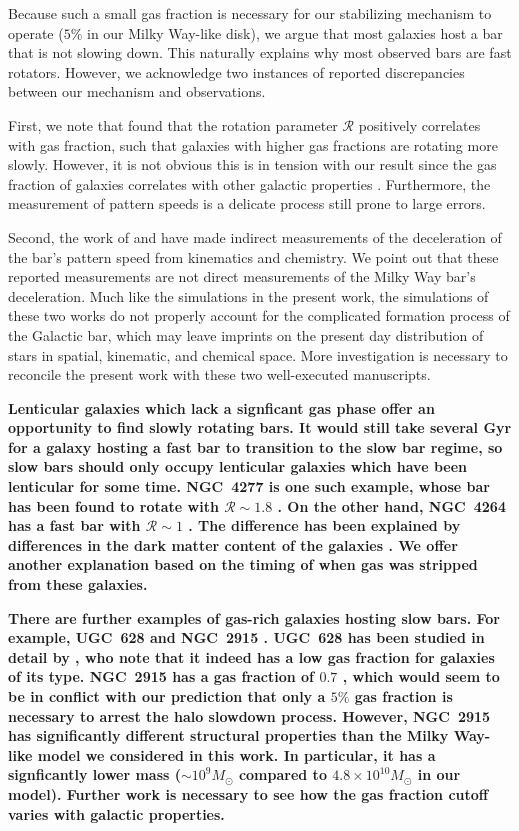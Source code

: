 \documentclass[twocolumn,linenumbers,trackchanges]{aastex631}
\newcommand{\Rot}{\ensuremath{\mathcal{R}}}
\newcommand{\Msun}{\ensuremath{M_{\odot}}}
\begin{document}
Because such a small gas fraction is necessary for our stabilizing mechanism to
operate ($5\%$ in our Milky Way-like disk), we argue that most galaxies host a
bar that is not slowing down. This naturally explains why most observed bars are
fast rotators. However, we acknowledge two instances of reported discrepancies
between our mechanism and observations.

First, we note that \citet{2020MNRAS.491.3655G} found that the rotation
parameter \Rot{} positively correlates with gas fraction, such that galaxies
with higher gas fractions are rotating more slowly. However, it is not obvious
this is in tension with our result since the gas fraction of galaxies correlates
with other galactic properties \citep{2009ARAA..47..159B}. Furthermore, the
measurement of pattern speeds is a delicate process still prone to large errors.

Second, the work of \citet{2021MNRAS.500.4710C} and \citet{2021MNRAS.505.2412C}
have made indirect measurements of the deceleration of the bar's pattern speed
from kinematics and chemistry. We point out that these reported measurements are
not direct measurements of the Milky Way bar's deceleration. Much like the
simulations in the present work, the simulations of these two works do not
properly account for the complicated formation process of the Galactic bar,
which may leave imprints on the present day distribution of stars in spatial,
kinematic, and chemical space. More investigation is necessary to reconcile the
present work with these two well-executed manuscripts.

{\bf Lenticular galaxies which lack a signficant gas phase offer an opportunity
to find slowly rotating bars. It would still take several Gyr for a galaxy
hosting a fast bar to transition to the slow bar regime, so slow bars should
only occupy lenticular galaxies which have been lenticular for some time.
NGC~4277 is one such example, whose bar has been found to rotate with
$\Rot{}\sim1.8$ \citep{2022AA...664L..10B}. On the other hand, NGC~4264 has a
fast bar with $\Rot{}\sim1$ \citep{2019MNRAS.488.4972C}. The difference has been
explained by differences in the dark matter content of the galaxies
\citep{2023MNRAS.521.2227B}. We offer another explanation based on the timing of
when gas was stripped from these galaxies.}

{\bf There are further examples of gas-rich galaxies hosting slow bars. For
example, UGC~628 \citep[$\Rot\sim2$;][]{2009AA...499L..25C} and NGC~2915
\citep[$\Rot>1.7$;][]{1999AJ....118.2158B}. UGC~628
has been studied in detail by \citet{2016MNRAS.463.1751C}, who note that it
indeed has a low gas fraction for galaxies of its type. NGC~2915 has a gas
fraction of $0.7$ \citep{2010ApJ...715..656W}, which would seem to be in
conflict with our prediction that only a $5\%$ gas fraction is necessary to
arrest the halo slowdown process. However, NGC~2915 has significantly different
structural properties than the Milky Way-like model we considered in this work.
In particular, it has a signficantly lower mass ($\sim10^9\Msun$ compared to
$4.8\times10^{10}\Msun$ in our model). Further work is necessary to see how the
gas fraction cutoff varies with galactic properties.}
\end{document}

